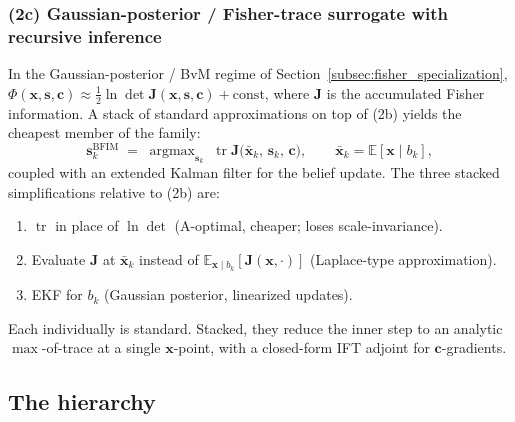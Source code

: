 \documentclass[11pt,a4paper]{article}
\newcommand{\E}{\mathbb{E}}
\newcommand{\tr}{\operatorname{tr}}
\newcommand{\argmax}{\operatorname{argmax}}
\begin{document}
\subsubsection*{(2c) Gaussian-posterior / Fisher-trace surrogate with recursive inference}

In the Gaussian-posterior / BvM regime of Section~\ref{subsec:fisher_specialization}, $\Phi(\bm{x},\bm{s},\bm{c}) \approx \tfrac{1}{2}\ln\det \bm{J}(\bm{x},\bm{s},\bm{c}) + \mathrm{const}$, where $\bm{J}$ is the accumulated Fisher information.  A stack of standard approximations on top of (2b) yields the cheapest member of the family:
\begin{equation}
  \bm{s}_k^{\mathrm{BFIM}} \;=\; \argmax_{\bm{s}_k}\;\tr \bm{J}\bigl(\bar{\bm{x}}_k,\,\bm{s}_k,\,\bm{c}\bigr),
  \qquad
  \bar{\bm{x}}_k = \E[\bm{x}\mid b_k],
  \label{eq:bfim_rule}
\end{equation}
coupled with an extended Kalman filter for the belief update.  The three stacked simplifications relative to (2b) are:
\begin{enumerate}[label=(\roman*), leftmargin=2em, nosep]
  \item $\tr$ in place of $\ln\det$ (A-optimal, cheaper; loses scale-invariance).
  \item Evaluate $\bm{J}$ at $\bar{\bm{x}}_k$ instead of $\E_{\bm{x}\mid b_k}[\bm{J}(\bm{x},\cdot)]$ (Laplace-type approximation).
  \item EKF for $b_k$ (Gaussian posterior, linearized updates).
\end{enumerate}
Each individually is standard.  Stacked, they reduce the inner step to an analytic $\max$-of-trace at a single $\bm{x}$-point, with a closed-form IFT adjoint for $\bm{c}$-gradients.

\subsection{The hierarchy}
\end{document}
